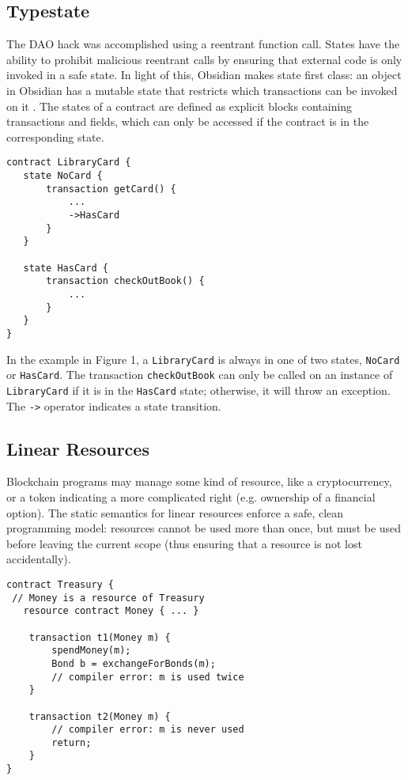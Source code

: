 \documentclass[sigplan,10pt,review]{acmart}\settopmatter{printfolios=true}
\begin{document}
\subsection{Typestate}

The DAO hack was accomplished using a reentrant function call. States have the ability to 
prohibit malicious reentrant calls by ensuring that external code is only invoked in a safe state. 
In light of this, Obsidian makes state first class: an object in Obsidian has a mutable state that restricts which 
transactions can be invoked on it \cite{Aldrich}. The states of a contract are defined as explicit blocks containing 
transactions and fields, which can only be accessed if the contract is in the corresponding state. 

\begin{lstlisting}[caption={An example of states in Obsidian.},captionpos=b]
contract LibraryCard {
   state NoCard {
       transaction getCard() {
           ...
           ->HasCard
       }
   }
  
   state HasCard {
       transaction checkOutBook() {
           ...
       }
   }
}
\end{lstlisting}

In the example in Figure 1,  a \texttt{\small{LibraryCard}} is always in one of two
states, \texttt{\small{NoCard}} or \texttt{\small{HasCard}}. The transaction 
\texttt{\small{checkOutBook}} can only be called on an instance of 
\texttt{\small{LibraryCard}} if it is in the \texttt{\small{HasCard}} state; otherwise, it will throw an exception. 
The \texttt{\small{->}} operator indicates a state transition.

\subsection{Linear Resources}

Blockchain programs may manage some kind of resource, like a cryptocurrency, or a token 
indicating a more complicated right (e.g. ownership of a financial option). The static semantics for linear resources \cite{Wadler} 
enforce a safe, clean programming model: resources cannot be used more than once, but must be 
used before leaving the current scope (thus ensuring that a resource is not lost accidentally). 

\begin{lstlisting}[caption={Linear resources in Obsidian},captionpos=b]
contract Treasury {
 // Money is a resource of Treasury
   resource contract Money { ... }

    transaction t1(Money m) {
        spendMoney(m);
        Bond b = exchangeForBonds(m);
        // compiler error: m is used twice
    }

    transaction t2(Money m) {
        // compiler error: m is never used
        return;
    }
}
\end{lstlisting}
\end{document}
